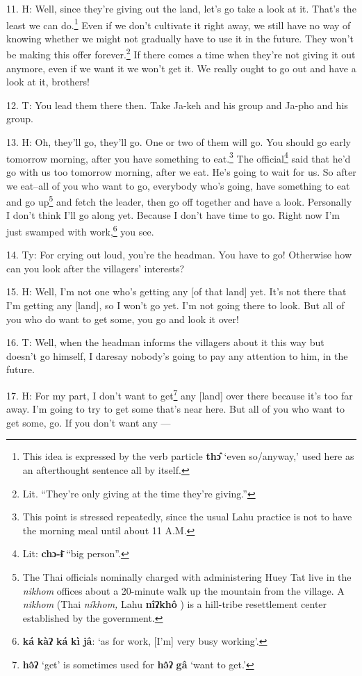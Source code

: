 11. H: Well, since they're giving out the land, let's go take a look at it. That's
the least we can do.\footnote{This idea is expressed by the verb particle \textbf{thɔ̂} `even so/anyway,' used here as an afterthought sentence all by itself.} Even if we don't cultivate it right away, we still have
no way of knowing whether we might not gradually have to use it in the future.
They won't be making this offer forever.\footnote{Lit. ``They're only giving at the time they're giving.''} If there comes a time when they're
not giving it out anymore, even if we want it we won't get it. We really ought
to go out and have a look at it, brothers!

12. T: You lead them there then. Take Ja-keh and his group and Ja-pho and his
group.

13. H: Oh, they'll go, they'll go. One or two of them will go. You should go early
tomorrow morning, after you have something to eat.\footnote{This point is stressed repeatedly, since the usual Lahu practice is not to have the morning meal until about 11 A.M.} The official\footnote{Lit: \textbf{chɔ-ɨ̄} ``big person''.} said that
he'd go with us too tomorrow morning, after we eat. He's going to wait for us.
So after we eat--all of you who want to go, everybody who's going, have something
to eat and go up\footnote{The Thai officials nominally charged with administering Huey Tat live in the \textit{nikhom } offices about a 20-minute walk up the mountain from the village. A \textit{nikhom } (Thai \textit{níkhom, }Lahu \textbf{nîʔkhô} ) is a hill-tribe resettlement center established by the government.} and fetch the leader, then go off together and have a look.
Personally I don't think I'll go along yet. Because I don't have time to go. Right
now I'm just swamped with work,\footnote{\textbf{ká} \textbf{kàʔ} \textbf{ká} \textbf{kì} \textbf{jâ}: `as for work, [I'm] very busy working'.} you see.

14. Ty: For crying out loud, you're the headman. You have to go! Otherwise
how can you look after the villagers' interests?

15. H: Well, I'm not one who's getting any [of that land] yet. It's not there that
I'm getting any [land], so I won't go yet. I'm not going there to look. But all
of you who do want to get some, you go and look it over!

16. T: Well, when the headman informs the villagers about it this way but doesn't
go himself, I daresay nobody's going to pay any attention to him, in the future.

17. H: For my part, I don't want to get\footnote{\textbf{hə̂ʔ} `get' is sometimes used for \textbf{hə̂ʔ} \textbf{gâ} `want to get.'} any [land] over there because it's too
far away. I'm going to try to get some that's near here. But all of you who want
to get some, go. If you don't want any ---

